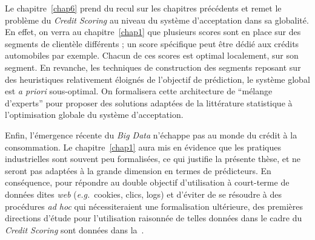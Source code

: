 Le chapitre~\ref{chap6} prend du recul sur les chapitres précédents et remet le problème du \textit{Credit Scoring} au niveau du système d'acceptation dans sa globalité. En effet, on verra au chapitre~\ref{chap1} que plusieurs scores sont en place sur des segments de clientèle différents ; un score spécifique peut être dédié aux crédits automobiles par exemple. Chacun de ces scores est optimal localement, sur son segment. En revanche, les techniques de construction des segments reposant sur des heuristiques relativement éloignés de l'objectif de prédiction, le système global est \textit{a priori} sous-optimal. On formalisera cette architecture de ``mélange d'experts'' pour proposer des solutions adaptées de la littérature statistique à l'optimisation globale du système d'acceptation.

Enfin, l'émergence récente du \textit{Big Data} n'échappe pas au monde du crédit à la consommation. Le chapitre~\ref{chap1} aura mis en évidence que les pratiques industrielles sont souvent peu formalisées, ce qui justifie la présente thèse, et ne seront pas adaptées à la grande dimension en termes de prédicteurs. En conséquence, pour répondre au double objectif d'utilisation à court-terme de données dites \textit{web} (\textit{e.g.}\ cookies, clics, logs) et d'éviter de se résoudre à des procédures \textit{ad hoc} qui nécessiteraient une formalisation ultérieure, des premières directions d'étude pour l'utilisation raisonnée de telles données dans le cadre du \textit{Credit Scoring} sont données dans la~.

\printbibliography[heading=subbibliography, title=Références de l'avant-propos]